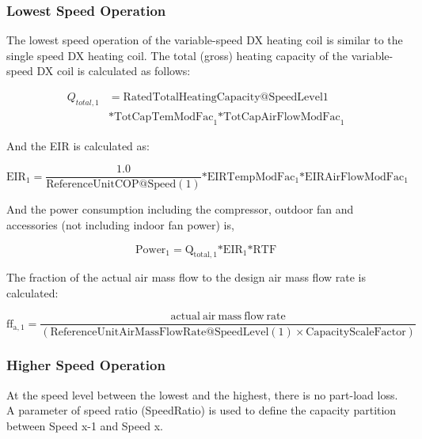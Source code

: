 \subsubsection{Lowest Speed Operation}\label{lowest-speed-operation-201605050922}

The lowest speed operation of the variable-speed DX heating coil is similar to the single speed DX heating coil. The total (gross) heating capacity of the variable-speed DX coil is calculated as follows:

\begin{equation}
  \begin{array}{rl}
    Q_{total,1} &= \mathrm{RatedTotalHeatingCapacity @ SpeedLevel 1} \\
                &* \mathrm{TotCapTemModFac}_1 \mathrm{* TotCapAirFlowModFac}_1
  \end{array}
\end{equation}

And the EIR is calculated as:

\begin{equation}
{\mathrm{EI}}{{\mathrm{R}}_1} = \frac{{1.0}}{{{\mathrm{ReferenceUnitCOP}}@{\mathrm{Speed}}(1)}}{\mathrm{*EIRTempModFa}}{{\mathrm{c}}_1}{\mathrm{*EIRAirFlowModFa}}{{\mathrm{c}}_1}
\end{equation}

And the power consumption including the compressor, outdoor fan and accessories (not including indoor fan power) is,

\begin{equation}
{\mathrm{Powe}}{{\mathrm{r}}_1} = {{\mathrm{Q}}_{{\mathrm{total}},1}}{\mathrm{*EI}}{{\mathrm{R}}_1}{\mathrm{*RTF}}
\end{equation}

The fraction of the actual air mass flow to the design air mass flow rate is calculated:

\begin{equation}
{\mathrm{f}}{{\mathrm{f}}_{{\mathrm{a}},1}} = \frac{{{\mathrm{actual~air~mass~flow~rate}}}}{{({\mathrm{ReferenceUnitAirMassFlowRate}}@{\mathrm{SpeedLevel}}(1) \times {\mathrm{CapacityScaleFactor}})}}{\mathrm{}}
\end{equation}

\subsubsection{Higher Speed Operation}\label{higher-speed-operation-1-001}

At the speed level between the lowest and the highest, there is no part-load loss. A parameter of speed ratio (SpeedRatio) is used to define the capacity partition between Speed x-1 and Speed x.

